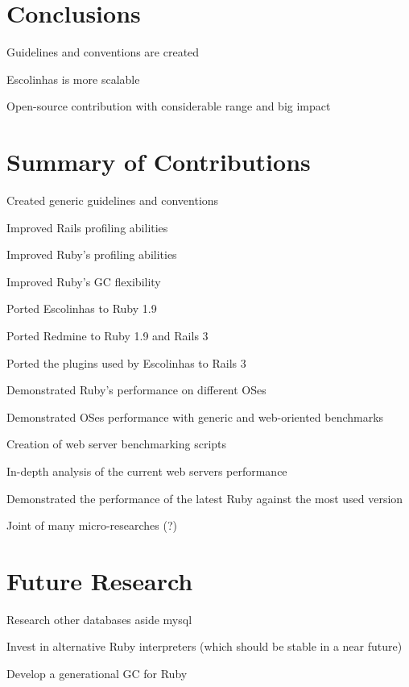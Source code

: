 \begin{comment}
Rails is growing fast and version 3 will soon to be publicly released. It solves many existing performance bottlenecks in Rails 2.3 and improves its predecessor code by a great deal. Working on Rails 2.3 would not be very productive since it will soon become deprecated and inefficient when compared with the most recent version. Version 3 will be the main target focus for further development.

The application itself, \textit{Escolinhas}, would benefit from huge performance gains just by being ported to Ruby 1.9 and Rails 3. The remaining improvements are dependant on the improvement cycles of all the components mentioned before, as performance bottlenecks must be found and solved on each setup.

Ultimately this research provided a careful overview over the involved technologies and their current state, sustaining the creation of a solid research and development plan for future efforts.
\end{comment}

\section{Conclusions}
Guidelines and conventions are created

Escolinhas is more scalable

Open-source contribution with considerable range and big impact


\section{Summary of Contributions}

Created generic guidelines and conventions

Improved Rails profiling abilities

Improved Ruby's profiling abilities

Improved Ruby's GC flexibility

Ported Escolinhas to Ruby 1.9

Ported Redmine to Ruby 1.9 and Rails 3

Ported the plugins used by Escolinhas to Rails 3

Demonstrated Ruby's performance on different OSes

Demonstrated OSes performance with generic and web-oriented benchmarks

Creation of web server benchmarking scripts

In-depth analysis of the current web servers performance

Demonstrated the performance of the latest Ruby against the most used version

Joint of many micro-researches (?)


\section{Future Research}

Research other databases aside mysql

Invest in alternative Ruby interpreters (which should be stable in a near future)

Develop a generational GC for Ruby

